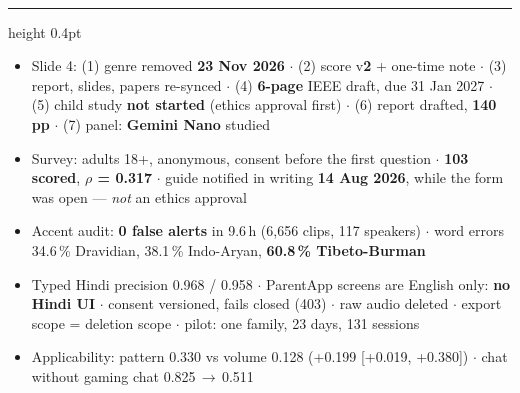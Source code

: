 \documentclass[10pt,a4paper]{article}
\newcommand{\sect}[1]{\vspace{2mm}{\color{teal}\bfseries\small\MakeUppercase{#1}}\\[0.6mm]\hrule height 0.4pt\vspace{1.2mm}}
\begin{document}
\sect{Numbers cold}
\begin{itemize}[leftmargin=4mm,itemsep=0.3mm,topsep=0mm]\small
\item Slide 4: (1) genre removed \textbf{23 Nov 2026} $\cdot$ (2) score v\textbf{2} + one-time note $\cdot$ (3) report, slides, papers re-synced $\cdot$ (4) \textbf{6-page} IEEE draft, due 31 Jan 2027 $\cdot$ (5) child study \textbf{not started} (ethics approval first) $\cdot$ (6) report drafted, \textbf{140 pp} $\cdot$ (7) panel: \textbf{Gemini Nano} studied
\item Survey: adults 18+, anonymous, consent before the first question $\cdot$ \textbf{103 scored}, \textbf{$\rho$ = 0.317} $\cdot$ guide notified in writing \textbf{14 Aug 2026}, while the form was open --- \emph{not} an ethics approval
\item Accent audit: \textbf{0 false alerts} in 9.6\,h (6,656 clips, 117 speakers) $\cdot$ word errors 34.6\,\% Dravidian, 38.1\,\% Indo-Aryan, \textbf{60.8\,\% Tibeto-Burman}
\item Typed Hindi precision 0.968 / 0.958 $\cdot$ ParentApp screens are English only: \textbf{no Hindi UI} $\cdot$ consent versioned, fails closed (403) $\cdot$ raw audio deleted $\cdot$ export scope = deletion scope $\cdot$ pilot: one family, 23 days, 131 sessions
\item Applicability: pattern 0.330 vs volume 0.128 (+0.199 [+0.019, +0.380]) $\cdot$ chat without gaming chat 0.825\,$\to$\,0.511
\end{itemize}
\end{document}
